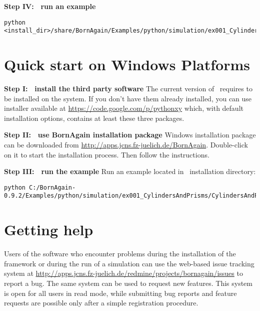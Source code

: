 \noindent
{\bf Step IV: $~$ run an example}
\begin{lstlisting}[language=shell, style=commandline]
python <install_dir>/share/BornAgain/Examples/python/simulation/ex001_CylindersAndPrisms/CylindersAndPrisms.py
\end{lstlisting}



\section{Quick start on Windows Platforms}

\noindent
{\bf Step I: $~$ install the third party software} \newline
The current version of \BornAgain\ requires  
to be installed on the system. If you don't have them already installed,
you can use  installer available 
at \url{https://code.google.com/p/pythonxy} which, with default installation options, contains at least these three packages.
\vspace*{2mm}

\noindent
{\bf Step II: $~$ use BornAgain installation package } \newline
Windows installation package can be downloaded from \url{http://apps.jcns.fz-juelich.de/BornAgain}.
Double-click on it to start the installation process. Then follow the instructions.
\vspace*{2mm}

\noindent
{\bf Step III: $~$ run the example} \newline
Run an example located in \BornAgain\ installation directory:
\begin{lstlisting}[language=shell, style=commandline]
python C:/BornAgain-0.9.2/Examples/python/simulation/ex001_CylindersAndPrisms/CylindersAndPrisms.py
\end{lstlisting}


\section{Getting help}
Users of the software who encounter problems during the installation
of the framework or during the run of a simulation can use the web-based issue tracking system
at
\url{http://apps.jcns.fz-juelich.de/redmine/projects/bornagain/issues}
to report a bug. The same system can be used to request new features.
This system is open for all users in read mode, while 
submitting bug reports and feature requests are possible only after a simple registration
procedure.






